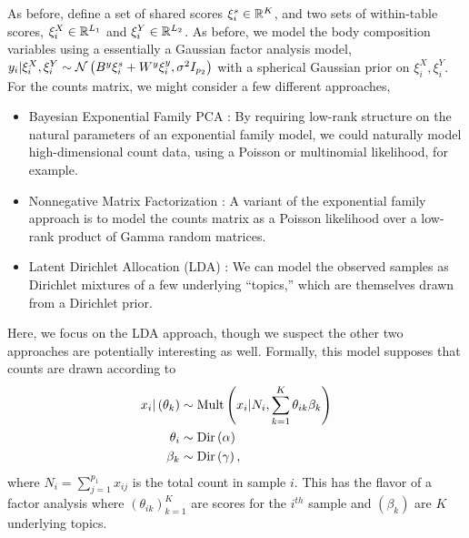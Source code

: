 \documentclass[14pt]{extarticle}
\begin{document}
As before, define a set of shared scores $\xi_{i}^{s} \in \mathbb{R}^{K}$, and two
sets of within-table scores, $\xi_{i}^{X} \in \mathbb{R}^{L_{1}}$ and $\xi_{i}^{Y}
\in \mathbb{R}^{L_{2}}$. As before, we model the body composition variables using a
essentially a Gaussian factor analysis model, $y_{i} \vert \xi_{i}^{X},
\xi_{i}^{Y} \sim \mathcal{N}\left(B^{y}\xi_{i}^s + W^y \xi_{i}^y,
\sigma^{2}I_{p_{2}}\right)$ with a spherical Gaussian prior on $\xi_{i}^{X},
\xi_{i}^{Y}$. For the counts matrix, we might consider a few different
approaches,

\begin{itemize}
\item Bayesian Exponential Family PCA \citep{mohamed2009bayesian}: By requiring
  low-rank structure on the natural parameters of an exponential family model,
  we could naturally model high-dimensional count data, using a Poisson or
  multinomial likelihood, for example.
\item Nonnegative Matrix Factorization \citep{lee2001algorithms}: A variant of
  the exponential family approach is to model the counts matrix as a Poisson
  likelihood over a low-rank product of Gamma random matrices.
\item Latent Dirichlet Allocation (LDA) \citep{blei2003latent}: We can model the
  observed samples as Dirichlet mixtures of a few underlying ``topics,'' which
  are themselves drawn from a Dirichlet prior.
\end{itemize}

Here, we focus on the LDA approach, though we suspect the other two approaches
are potentially interesting as well. Formally, this model supposes that counts
are drawn according to
\begin{align*}
  x_{i} \vert \left(\theta_{k}\right) &\sim \textnormal{Mult}\left(x_{i} \vert N_{i},
  \sum_{k = 1}^{K} \theta_{ik} \beta_{k}\right) \\
  \theta_{i} &\sim \textnormal{Dir}\left(\alpha\right)\\
  \beta_k &\sim \textnormal{Dir}\left(\gamma\right),
\end{align*}
where $N_i = \sum_{j = 1}^{p_1} x_{ij}$ is the total count in sample $i$. This
has the flavor of a factor analysis where $\left(\theta_{ik}\right)_{k =1}^{K}$
are scores for the $i^{th}$ sample and $\left(\beta_{k}\right)$ are $K$
underlying topics.
\end{document}

